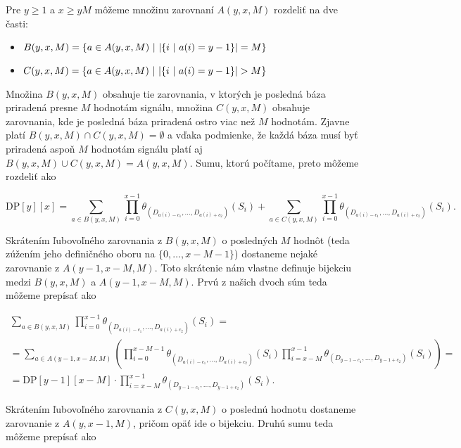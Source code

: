 Pre $y \geq 1$ a $x \geq y M$ môžeme množinu zarovnaní $A(y, x, M)$ rozdeliť na dve časti:

\begin{itemize}

\item $B(y, x, M) = \{a \in A(y, x, M) ~|~ \abs*{\{i ~|~ a(i) = y-1\}} = M\}$
\item $C(y, x, M) = \{a \in A(y, x, M) ~|~ \abs*{\{i ~|~ a(i) = y-1\}} > M\}$

\end{itemize}

Množina $B(y, x, M)$ obsahuje tie zarovnania, v ktorých je posledná báza priradená presne $M$ hodnotám signálu, množina $C(y, x, M)$ obsahuje
zarovnania, kde je posledná báza priradená ostro viac než $M$ hodnotám. Zjavne platí $B(y, x, M) \cap C(y, x, M) = \emptyset$ a vďaka podmienke,
že každá báza musí byť priradená aspoň $M$ hodnotám signálu platí aj $B(y, x, M) \cup C(y, x, M) = A(y, x, M)$. Sumu, ktorú počítame, preto
môžeme rozdeliť ako

$$\textrm{DP}[y][x] = \sum\limits_{a \in B(y, x, M)} \prod\limits_{i=0}^{x-1} \theta_{(D_{a(i)-c_1}, \dots, D_{a(i)+c_2})}(S_i)
+ \sum\limits_{a \in C(y, x, M)} \prod\limits_{i=0}^{x-1} \theta_{(D_{a(i)-c_1}, \dots, D_{a(i)+c_2})}(S_i) \text{.}$$

Skrátením ľubovoľného zarovnania z $B(y, x, M)$ o posledných $M$ hodnôt (teda zúžením jeho definičného oboru na $\{0, \dots, x-M-1\}$)
dostaneme nejaké zarovnanie z $A(y-1, x-M, M)$. Toto skrátenie nám vlastne definuje bijekciu medzi $B(y, x, M)$ a $A(y-1, x-M, M)$. Prvú z našich dvoch
súm teda môžeme prepísať ako

\begin{align*}
\sum\limits_{a \in B(y, x, M)} \prod\limits_{i=0}^{x-1} \theta_{(D_{a(i)-c_1}, \dots, D_{a(i)+c_2})}(S_i) = \\
= \sum\limits_{a \in A(y-1, x-M, M)}\left( \prod\limits_{i=0}^{x-M-1} \theta_{(D_{a(i)-c_1}, \dots, D_{a(i)+c_2})}(S_i)  \prod\limits_{i=x-M}^{x-1}\theta_{(D_{y-1-c_1}, \dots, D_{y-1+c_2})}(S_i)\right) = \\
= \mathrm{DP}[y-1][x-M] \cdot \prod\limits_{i=x-M}^{x-1}\theta_{(D_{y-1-c_1}, \dots, D_{y-1+c_2})}(S_i) \text{.}
\end{align*}

Skrátením ľubovoľného zarovnania z $C(y, x, M)$ o poslednú hodnotu dostaneme zarovnanie z $A(y, x-1, M)$, pričom opäť ide o bijekciu. Druhú sumu teda
môžeme prepísať ako


